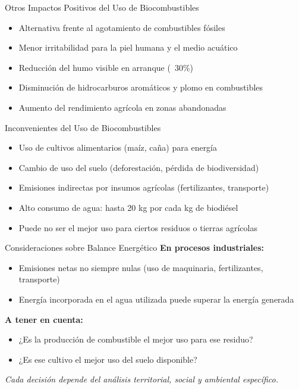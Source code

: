 \documentclass[../../main.tex]{subfiles}
\begin{document}
\begin{frame}{Otros Impactos Positivos del Uso de Biocombustibles}
\justifying
\begin{itemize}
  \item Alternativa frente al agotamiento de combustibles fósiles
  \item Menor irritabilidad para la piel humana y el medio acuático
  \item Reducción del humo visible en arranque (~30\%)
  \item Disminución de hidrocarburos aromáticos y plomo en combustibles
  \item Aumento del rendimiento agrícola en zonas abandonadas
\end{itemize}
\end{frame}
\begin{frame}{Inconvenientes del Uso de Biocombustibles}
\justifying
\begin{itemize}
  \item Uso de cultivos alimentarios (maíz, caña) para energía
  \item Cambio de uso del suelo (deforestación, pérdida de biodiversidad)
  \item Emisiones indirectas por insumos agrícolas (fertilizantes, transporte)
  \item Alto consumo de agua: hasta 20 kg por cada kg de biodiésel
  \item Puede no ser el mejor uso para ciertos residuos o tierras agrícolas
\end{itemize}
\end{frame}
\begin{frame}{Consideraciones sobre Balance Energético}
\justifying
\textbf{En procesos industriales:}
\begin{itemize}
  \item Emisiones netas no siempre nulas (uso de maquinaria, fertilizantes, transporte)
  \item Energía incorporada en el agua utilizada puede superar la energía generada
\end{itemize}

\vspace{0.5em}
\textbf{A tener en cuenta:}
\begin{itemize}
  \item ¿Es la producción de combustible el mejor uso para ese residuo?
  \item ¿Es ese cultivo el mejor uso del suelo disponible?
\end{itemize}

\vspace{0.5em}
\textit{Cada decisión depende del análisis territorial, social y ambiental específico.}
\end{frame}
\end{document}
